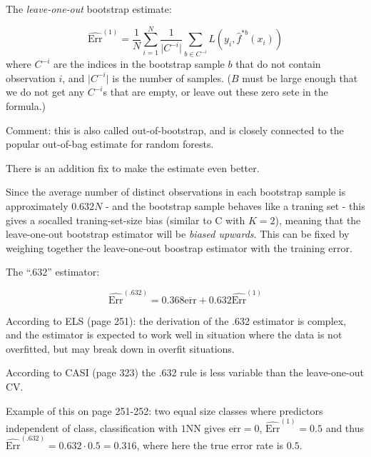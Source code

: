 \documentclass[
  ignorenonframetext,
]{beamer}
\begin{document}
\begin{frame}

The \emph{leave-one-out} bootstrap estimate:

\[\widehat{\text{Err}}^{(1)}=\frac{1}{N} \sum_{i=1}^N \frac{1}{\lvert C^{-i} \rvert} \sum_{b \in C^{-i}} L(y_i,\hat{f}^{*b}(x_i))\]
where \(C^{-i}\) are the indices in the bootstrap sample \(b\) that do
not contain observation \(i\), and \(\lvert C^{-i} \rvert\) is the
number of samples. (\(B\) must be large enough that we do not get any
\(C^{-i}\)s that are empty, or leave out these zero sete in the
formula.)

Comment: this is also called out-of-bootstrap, and is closely connected
to the popular out-of-bag estimate for random forests.

\end{frame}

\begin{frame}

There is an addition fix to make the estimate even better.

Since the average number of distinct observations in each bootstrap
sample is approximately \(0.632 N\) - and the bootstrap sample behaves
like a traning set - this gives a socalled traning-set-size bias
(similar to C with \(K=2\)), meaning that the leave-one-out bootstrap
estimator will be \emph{biased upwards}. This can be fixed by weighing
together the leave-one-out boostrap estimator with the training error.

The ``.632'' estimator:

\[\widehat{\text{Err}}^{(.632)}=0.368 \overline{\text{err}}+0.632 \widehat{\text{Err}}^{(1)}\]

\end{frame}

\begin{frame}

According to ELS (page 251): the derivation of the .632 estimator is
complex, and the estimator is expected to work well in situation where
the data is not overfitted, but may break down in overfit situations.

According to CASI (page 323) the .632 rule is less variable than the
leave-one-out CV.

Example of this on page 251-252: two equal size classes where predictors
independent of class, classification with \(1\)NN gives
\(\overline{\text{err}}=0\), \(\widehat{\text{Err}}^{(1)}=0.5\) and thus
\(\widehat{\text{Err}}^{(.632)}=0.632\cdot 0.5=0.316\), where here the
true error rate is \(0.5\).

\end{frame}
\end{document}
